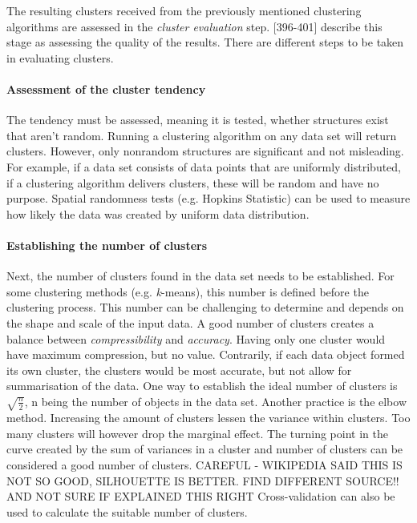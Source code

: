 The resulting clusters received from the previously mentioned clustering algorithms are assessed in the \textit{cluster evaluation} step. \textcite{han2011data}[396-401] describe this stage as assessing the quality of the results.
There are different steps to be taken in evaluating clusters. 
 
  \paragraph{Assessment of the cluster tendency}
  The tendency must be assessed, meaning it is tested, whether structures exist that aren't random. Running a clustering algorithm on any data set will return clusters. However, only nonrandom structures are significant and not misleading. For example, if a data set consists of data points that are uniformly distributed, if a clustering algorithm delivers clusters, these will be random and have no purpose. Spatial randomness tests (e.g. Hopkins Statistic) can be used to measure how likely the data was created by uniform data distribution.

  \paragraph{Establishing the number of clusters}
  Next, the number of clusters found in the data set needs to be established. For some clustering methods (e.g. \textit{k}-means), this number is defined before the clustering process. This number can be challenging to determine and depends on the shape and scale of the input data. A good number of clusters creates a balance between \textit{compressibility} and \textit{accuracy}. Having only one cluster would have maximum compression, but no value. Contrarily, if each data object formed its own cluster, the clusters would be most accurate, but not allow for summarisation of the data. 
  One way to establish the ideal number of clusters is  $\sqrt{\frac{n}{2}}$, n being the number of objects in the data set.
  Another practice is the elbow method. Increasing the amount of clusters lessen the variance within clusters. Too many clusters will however drop the marginal effect. The turning point in the curve created by the sum of variances in a cluster and number of clusters can be considered a good number of clusters. CAREFUL - WIKIPEDIA SAID THIS IS NOT SO GOOD, SILHOUETTE IS BETTER. FIND DIFFERENT SOURCE!! AND NOT SURE IF EXPLAINED THIS RIGHT
  Cross-validation can also be used to calculate the suitable number of clusters.

